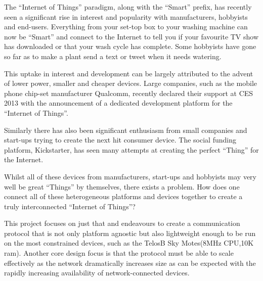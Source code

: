 The ``Internet of Things'' paradigm, along with the ``Smart'' prefix, has recently seen a significant rise in interest and popularity with manufacturers, hobbyists and end-users. Everything from your set-top box to your washing machine can now be ``Smart'' and connect to the Internet to tell you if your favourite TV show has downloaded or that your wash cycle has complete\cite{LG, SmartCraze}. Some hobbyists have gone so far as to make a plant send a text or tweet when it needs watering\cite{Botanicalls, TweetPlant}.

This uptake in interest and development can be largely attributed to the advent of lower power, smaller and cheaper devices. Large companies, such as the mobile phone chip-set manufacturer Qualcomm, recently declared their support at CES 2013 with the announcement of a dedicated development platform for the ``Internet of Things''\cite{Qualcomm}.

Similarly there has also been significant enthusiasm from small companies and start-ups trying to create the next hit consumer device. The social funding platform, Kickstarter\cite{Kickstarter}, has seen many attempts at creating the perfect ``Thing'' for the Internet\cite{SmartThings, Twine}.

Whilst all of these devices from manufacturers, start-ups and hobbyists may very well be great ``Things'' by themselves, there exists a problem. How does one connect all of these heterogeneous platforms and devices together to create a truly interconnected ``Internet of Things''?

This project focuses on just that and endeavours to create a communication protocol that is not only platform agnostic but also lightweight enough to be run on the most constrained devices, such as the TelosB Sky Motes(8MHz CPU,10K ram)\cite{TelosB}. Another core design focus is that the protocol must be able to scale effectively as the network dramatically increases size as can be expected with the rapidly increasing availability of network-connected devices.